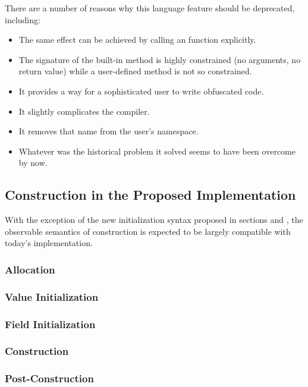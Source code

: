 There are a number of reasons why this language feature should be deprecated, including:
\begin{itemize}
\item The same effect can be achieved by calling an  function explicitly.
\item The signature of the built-in  method is highly constrained (no
  arguments, no return value) while a user-defined  method is not so
  constrained. 
\item It provides a way for a sophisticated user to write obfuscated code.
\item It slightly complicates the compiler.
\item It removes that name from the user's namespace.
\item Whatever was the historical problem it solved seems to have been overcome by now.
\end{itemize}


\subsection{Construction in the Proposed Implementation}

With the exception of the new initialization syntax proposed in sections
 and , the observable semantics of construction is
expected to be largely compatible with today's implementation.  
\subsubsection{Allocation}

\subsubsection{Value Initialization}

\subsubsection{Field Initialization}

\subsubsection{Construction}

\subsubsection{Post-Construction}

